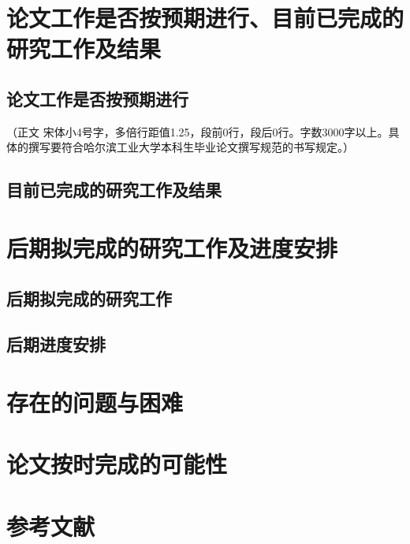 \section{论文工作是否按预期进行、目前已完成的研究工作及结果}
\subsection{论文工作是否按预期进行}
（正文  宋体小4号字，多倍行距值1.25，段前0行，段后0行。字数3000字以上。具体的撰写要符合哈尔滨工业大学本科生毕业论文撰写规范的书写规定。）
\subsection{目前已完成的研究工作及结果}
\section{后期拟完成的研究工作及进度安排}
\subsection{后期拟完成的研究工作}
\subsection{后期进度安排}
\section{存在的问题与困难}
\section{论文按时完成的可能性}
\section{参考文献}



